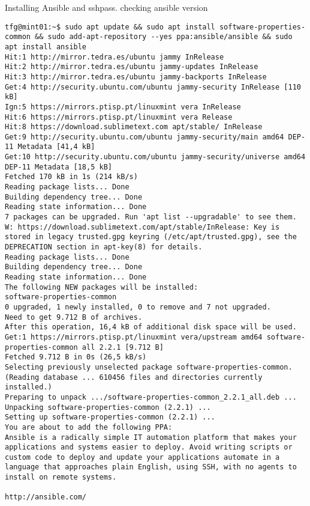 \documentclass[../main.tex]{subfiles}
\begin{document}
Installing Ansible and sshpass. checking ansible version
\lstconsolestyle
\begin{lstlisting}
tfg@mint01:~$ sudo apt update && sudo apt install software-properties-common && sudo add-apt-repository --yes ppa:ansible/ansible && sudo apt install ansible
Hit:1 http://mirror.tedra.es/ubuntu jammy InRelease
Hit:2 http://mirror.tedra.es/ubuntu jammy-updates InRelease                    
Hit:3 http://mirror.tedra.es/ubuntu jammy-backports InRelease                  
Get:4 http://security.ubuntu.com/ubuntu jammy-security InRelease [110 kB]      
Ign:5 https://mirrors.ptisp.pt/linuxmint vera InRelease                        
Hit:6 https://mirrors.ptisp.pt/linuxmint vera Release                          
Hit:8 https://download.sublimetext.com apt/stable/ InRelease                   
Get:9 http://security.ubuntu.com/ubuntu jammy-security/main amd64 DEP-11 Metadata [41,4 kB]
Get:10 http://security.ubuntu.com/ubuntu jammy-security/universe amd64 DEP-11 Metadata [18,5 kB]
Fetched 170 kB in 1s (214 kB/s)              
Reading package lists... Done
Building dependency tree... Done
Reading state information... Done
7 packages can be upgraded. Run 'apt list --upgradable' to see them.
W: https://download.sublimetext.com/apt/stable/InRelease: Key is stored in legacy trusted.gpg keyring (/etc/apt/trusted.gpg), see the DEPRECATION section in apt-key(8) for details.
Reading package lists... Done
Building dependency tree... Done
Reading state information... Done
The following NEW packages will be installed:
software-properties-common
0 upgraded, 1 newly installed, 0 to remove and 7 not upgraded.
Need to get 9.712 B of archives.
After this operation, 16,4 kB of additional disk space will be used.
Get:1 https://mirrors.ptisp.pt/linuxmint vera/upstream amd64 software-properties-common all 2.2.1 [9.712 B]
Fetched 9.712 B in 0s (26,5 kB/s)                      
Selecting previously unselected package software-properties-common.
(Reading database ... 610456 files and directories currently installed.)
Preparing to unpack .../software-properties-common_2.2.1_all.deb ...
Unpacking software-properties-common (2.2.1) ...
Setting up software-properties-common (2.2.1) ...
You are about to add the following PPA:
Ansible is a radically simple IT automation platform that makes your applications and systems easier to deploy. Avoid writing scripts or custom code to deploy and update your applications automate in a language that approaches plain English, using SSH, with no agents to install on remote systems.

http://ansible.com/


\end{lstlisting}
\end{document}
